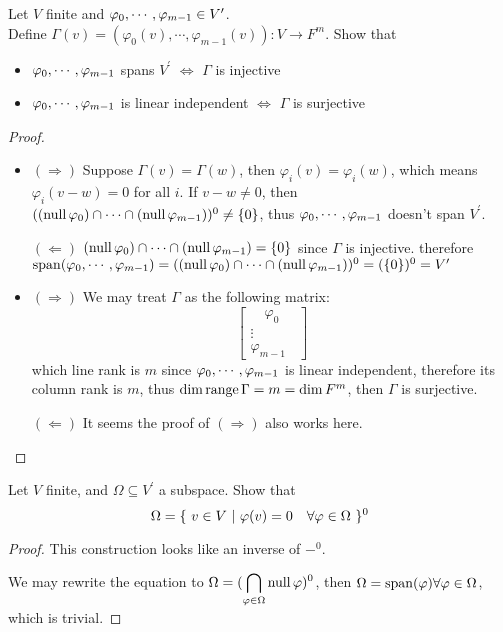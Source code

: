 \documentclass[../main.tex]{subfiles}
\begin{document}
\begin{exercise}
  Let $V$ finite and $\varphi_0 , \cdots , \varphi_{m - 1} \in V^\prime$. \\
  Define $\Gamma(v) = (\varphi_0(v), \cdots, \varphi_{m - 1}(v)) : V \rightarrow F^m$.
  Show that
  \begin{itemize}
    \item $\varphi_0 , \cdots , \varphi_{m - 1}$ spans $V^\prime$ $\iff$ $\Gamma$ is injective
    \item $\varphi_0 , \cdots , \varphi_{m - 1}$ is linear independent $\iff$ $\Gamma$ is surjective
  \end{itemize}
\end{exercise}
\begin{proof}
  ~
  \begin{itemize}
    \item $(\Rightarrow)$ Suppose $\Gamma(v) = \Gamma(w)$, then $\varphi_i(v) = \varphi_i(w)$,
          which means $\varphi_i(v - w) = 0$ for all $i$. If $v - w \neq 0$, then $((\operatorname{null} \varphi_0) \cap \cdots \cap (\operatorname{null} \varphi_{m - 1}))^0 \neq \{0\}$,
          thus $\varphi_0 , \cdots , \varphi_{m - 1}$ doesn't span $V^\prime$.

          $(\Leftarrow)$ $(\operatorname{null} \varphi_0) \cap \cdots \cap (\operatorname{null} \varphi_{m - 1}) = \{0\}$ since $\Gamma$ is injective.
          therefore $\operatorname{span}(\varphi_0 , \cdots , \varphi_{m - 1}) = ((\operatorname{null} \varphi_0) \cap \cdots \cap (\operatorname{null} \varphi_{m - 1}))^0 = (\{0\})^0 = V^\prime$
    \item $(\Rightarrow)$ We may treat $\Gamma$ as the following matrix:
          \[
          \begin{bmatrix}
            \quad \varphi_0 \quad \\
            \vdots \\
            \varphi_{m - 1}
          \end{bmatrix}
          \]
          which line rank is $m$ since $\varphi_0 , \cdots , \varphi_{m - 1}$ is linear independent,
          therefore its column rank is $m$, thus $\dim \operatorname{range} \Gamma = m = \dim F^m$, then $\Gamma$ is surjective.

          $(\Leftarrow)$ It seems the proof of $(\Rightarrow)$ also works here.
  \end{itemize}
\end{proof}

\begin{exercise}
  Let $V$ finite, and $\Omega \subseteq V^\prime$ a subspace. Show that
  \[
  \Omega = \{ \ v \in V \ | \ \varphi(v) = 0 \quad \forall \varphi \in \Omega \ \}^0
  \]
\end{exercise}
\begin{proof}
  This construction looks like an inverse of $-^0$.

  We may rewrite the equation to $\Omega = (\displaystyle \bigcap_{\varphi \in \Omega} \operatorname{null} \varphi)^0$,
  then $\Omega = \operatorname{span}(\varphi) \forall \varphi \in \Omega$, which is trivial.
\end{proof}
\end{document}
